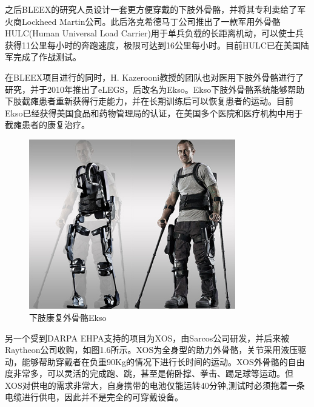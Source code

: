 之后BLEEX的研究人员设计一套更方便穿戴的下肢外骨骼\cite{p10}，并将其专利卖给了军火商Lockheed Martin公司。此后洛克希德马丁公司推出了一款军用外骨骼HULC(Human Universal Load Carrier)用于单兵负载的长距离机动，可以使士兵获得11公里每小时的奔跑速度，极限可达到16公里每小时。目前HULC已在美国陆军完成了作战测试。

在BLEEX项目进行的同时，H. Kazerooni教授的团队也对医用下肢外骨骼进行了研究，并于2010年推出了eLEGS\cite{p9}，后改名为Ekso。Ekso下肢外骨骼系统能够帮助下肢截瘫患者重新获得行走能力，并在长期训练后可以恢复患者的运动。目前Ekso已经获得美国食品和药物管理局的认证，在美国多个医院和医疗机构中用于截瘫患者的康复治疗。

\begin{figure}[htb]
    \includegraphics[width=9cm]{fig/f9_ekso.jpg}
    \caption{下肢康复外骨骼Ekso\cite{p9}}
    \label{fig:mark}
\end{figure}

另一个受到DARPA EHPA支持的项目为XOS\cite{p8}，由Sarcos公司研发，并后来被Raytheon公司收购，如图1.6所示。XOS为全身型的助力外骨骼，关节采用液压驱动，能够帮助穿戴者在负重90Kg的情况下进行长时间的运动。XOS外骨骼的自由度非常多，可以灵活的完成跑、跳，甚至是俯卧撑、拳击、踢足球等运动。但XOS对供电的需求非常大，自身携带的电池仅能运转40分钟,测试时必须拖着一条电缆进行供电，因此并不是完全的可穿戴设备。

